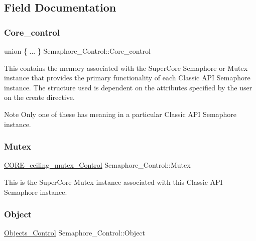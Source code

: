 \subsection{Field Documentation}
\mbox{\label{structSemaphore__Control_abfcffe005d3e94d1735f4a9659a3b3e1}} 
\subsubsection{\texorpdfstring{Core\_control}{Core\_control}}
{\footnotesize\ttfamily union \{ ... \}   Semaphore\+\_\+\+Control\+::\+Core\+\_\+control}

This contains the memory associated with the Super\+Core Semaphore or Mutex instance that provides the primary functionality of each Classic A\+PI Semaphore instance. The structure used is dependent on the attributes specified by the user on the create directive.

\begin{DoxyNote}{Note}
Only one of these has meaning in a particular Classic A\+PI Semaphore instance. 
\end{DoxyNote}
\mbox{\label{structSemaphore__Control_a6113e1e92ab2bc062ded9ac885188b3d}} 
\subsubsection{\texorpdfstring{Mutex}{Mutex}}
{\footnotesize\ttfamily \mbox{\hyperlink{structCORE__ceiling__mutex__Control}{C\+O\+R\+E\+\_\+ceiling\+\_\+mutex\+\_\+\+Control}} Semaphore\+\_\+\+Control\+::\+Mutex}

This is the Super\+Core Mutex instance associated with this Classic A\+PI Semaphore instance. \mbox{\label{structSemaphore__Control_a18fdf9ca5b2a9cf682ec2115b6e2ba95}} 
\subsubsection{\texorpdfstring{Object}{Object}}
{\footnotesize\ttfamily \mbox{\hyperlink{structObjects__Control}{Objects\+\_\+\+Control}} Semaphore\+\_\+\+Control\+::\+Object}



